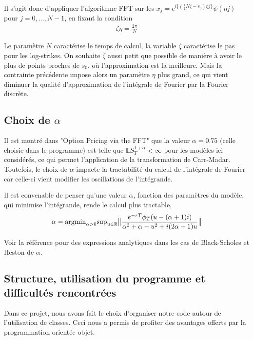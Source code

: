 \documentclass{article}
\begin{document}
Il s'agit donc d'appliquer l'algorithme FFT sur les $x_j= e^{i\{(\frac{1}{2}N\zeta-s_0)\eta j\}}\psi(\eta j)$ pour $j=0,\ldots, N-1$, en fixant la condition \begin{align*}
	\zeta \eta = \frac{2\pi}{N}
\end{align*}

Le paramètre $N$ caractérise le temps de calcul, la variable $\zeta$ caractérise le pas pour les log-strikes. On souhaite $\zeta$ aussi petit que possible de manière à avoir le plus de points proches de $s_0$, où l'approximation est la meilleure. Mais la contrainte précédente impose alors un paramètre $\eta$ plus grand, ce qui vient diminuer la qualité d'approximation de l'intégrale de Fourier par la Fourier discrète.

\subsection{Choix de $\alpha$}
Il est montré dans "Option Pricing via the FFT" que la valeur $\alpha = 0.75$ (celle choisie dans le programme) est telle que $\mathbb{E}S_T^{1+\alpha} <\infty$ pour les modèles ici considérés, ce qui permet l'application de la transformation de Carr-Madar. Toutefois, le choix de $\alpha$ impacte la tractabilité du calcul de l'intégrale de Fourier car celle-ci vient modifier les oscillations de l'intégrande. 

Il est convenable de penser qu'une valeur $\alpha$, fonction des paramètres du modèle, qui minimise l'intégrande, rende le calcul plus tractable, 
\begin{align*}
	\alpha = \textup{argmin}_{\alpha > 0} \textup{sup}_{u\in\mathbb{R}}\big\|\frac{e^{-rT}\phi_T(u-(\alpha+1)i)}{\alpha^2+\alpha-u^2+i(2\alpha+1)u}\big\|
\end{align*}

Voir la référence pour des expressions analytiques dans les cas de Black-Scholes et Heston de $\alpha$.
\subsection{Structure, utilisation du programme et difficultés rencontrées}
Dans ce projet, nous avons fait le choix d’organiser notre code autour de l’utilisation de classes. Ceci nous a permis de profiter des avantages offerts par la programmation orientée objet.
\end{document}
